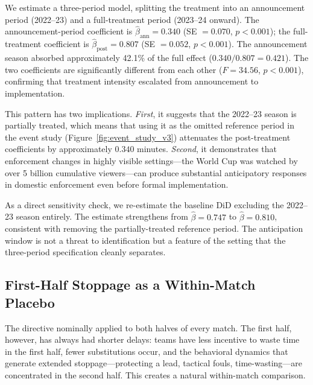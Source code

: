 We estimate a three-period model, splitting the treatment into an announcement period (2022--23) and a full-treatment period (2023--24 onward). The announcement-period coefficient is $\hat{\beta}_{\text{ann}} = 0.340$ (SE $= 0.070$, $p < 0.001$); the full-treatment coefficient is $\hat{\beta}_{\text{post}} = 0.807$ (SE $= 0.052$, $p < 0.001$). The announcement season absorbed approximately 42.1\% of the full effect ($0.340 / 0.807 = 0.421$). The two coefficients are significantly different from each other ($F = 34.56$, $p < 0.001$), confirming that treatment intensity escalated from announcement to implementation.

This pattern has two implications. \textit{First}, it suggests that the 2022--23 season is partially treated, which means that using it as the omitted reference period in the event study (Figure~\ref{fig:event_study_v3}) attenuates the post-treatment coefficients by approximately $0.340$ minutes. \textit{Second}, it demonstrates that enforcement changes in highly visible settings---the World Cup was watched by over 5 billion cumulative viewers---can produce substantial anticipatory responses in domestic enforcement even before formal implementation.

As a direct sensitivity check, we re-estimate the baseline DiD excluding the 2022--23 season entirely. The estimate strengthens from $\hat{\beta} = 0.747$ to $\hat{\beta} = 0.810$, consistent with removing the partially-treated reference period. The anticipation window is not a threat to identification but a feature of the setting that the three-period specification cleanly separates.


\subsection{First-Half Stoppage as a Within-Match Placebo}
\label{subsec:placebo}

The directive nominally applied to both halves of every match. The first half, however, has always had shorter delays: teams have less incentive to waste time in the first half, fewer substitutions occur, and the behavioral dynamics that generate extended stoppage---protecting a lead, tactical fouls, time-wasting---are concentrated in the second half. This creates a natural within-match comparison.

